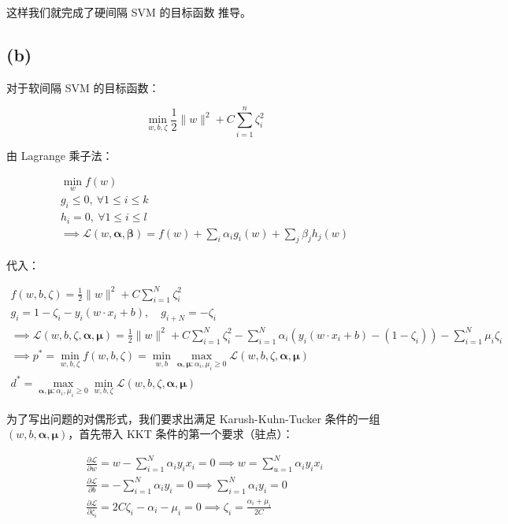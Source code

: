 \documentclass{ctexart}
\begin{document}
这样我们就完成了硬间隔 SVM 的目标函数 推导。

\subsection{(b)}\label{b}

对于软间隔 SVM 的目标函数：

\begin{equation*}
\min_{w,b,\zeta}\frac{1}{2}\|w\|^2+C\sum_{i=1}^n\zeta_i^2
\end{equation*}

由 Lagrange 乘子法：


\begin{gather*}
\min_{w}f(w)\\
g_{i} \le 0,~\forall 1\le i\le k\\
h_{i} = 0,~\forall 1\le i\le l\\
\implies \mathcal L(w,\boldsymbol\alpha,\boldsymbol\beta) = f(w)+\sum_{i}\alpha_i g_i(w) + \sum_{j}\beta_j h_j(w)
\end{gather*}


代入：


\begin{gather*}
f(w,b,\zeta) = \frac{1}{2}\|w\|^2+C\sum_{i=1}^{N}\zeta_i^2\\
g_i = 1 - \zeta_i - y_i(w\cdot x_i+b),\quad g_{i+N} = -\zeta_i\\
\implies \mathcal L(w,b,\zeta,\boldsymbol \alpha,\boldsymbol \mu) = \frac{1}{2}\|w\|^2+C\sum_{i=1}^N\zeta_{i}^2-\sum_{i=1}^N\alpha_i(y_i(w\cdot x_i+b) - (1-\zeta_i))-\sum_{i=1}^N\mu_{i}\zeta_i \\
\implies p^\ast = \min_{w,b,\zeta}f(w,b,\zeta)=\min_{w,b}\max_{\boldsymbol \alpha,\boldsymbol\mu:\alpha_i,\mu_i\ge 0}\mathcal L(w,b,\zeta,\boldsymbol \alpha,\boldsymbol \mu) \\
d^\ast = \max_{\boldsymbol\alpha,\boldsymbol \mu:\alpha_i,\mu_i\ge 0}\min_{w,b,\zeta}\mathcal L(w,b,\zeta,\boldsymbol \alpha,\boldsymbol \mu)
\end{gather*}


为了写出问题的对偶形式，我们要求出满足 Karush-Kuhn-Tucker 条件的一组
\((w,b,\boldsymbol \alpha, \boldsymbol \mu)\)，首先带入 KKT
条件的第一个要求（驻点）：


\begin{gather*}
\frac{\partial \mathcal L}{\partial w} = w - \sum_{i=1}^N\alpha_iy_ix_i=0\implies w=\sum_{u=1}^N\alpha_iy_ix_i\\
\frac{\partial \mathcal L}{\partial b} = -\sum_{i=1}^N\alpha_iy_i=0\implies \sum_{i=1}^N\alpha_iy_i = 0\\
\frac{\partial \mathcal L}{\partial \zeta_i} = 2C\zeta_i-\alpha_i-\mu_i=0\implies \zeta_i=\frac{\alpha_i + \mu_i}{2C}
\end{gather*}
\end{document}
